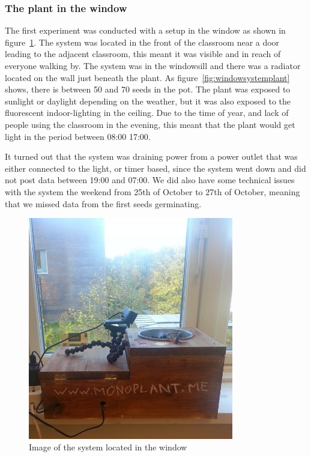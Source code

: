 \subsubsection*{The plant in the window}
The first experiment was conducted with a setup in the window as shown in figure~\ref{fig:windowplant}. The system was located in the front of the classroom near a door leading to the adjacent classroom, this meant it was visible and in reach of everyone walking by. The system was in the windowsill and there was a radiator located on the wall just beneath the plant. As figure~\ref{fig:windowsystemplant} shows, there is between 50 and 70 seeds in the pot. The plant was exposed to sunlight or daylight depending on the weather, but it was also exposed to the fluorescent indoor-lighting in the ceiling. Due to the time of year, and lack of people using the classroom in the evening, this meant that the plant would get light in the period between 08:00 17:00.

It turned out that the system was draining power from a power outlet that was either connected to the light, or timer based, since the system went down and did not post data between 19:00 and 07:00. We did also have some technical issues with the system the weekend from 25th of October to 27th of October, meaning that we missed data from the first seeds germinating.

\begin{figure}
\centering
\includegraphics[width=0.8\textwidth]{img/empiricalsetting/window.jpg}
\caption{Image of the system located in the window}
\label{fig:windowplant}
\end{figure}

